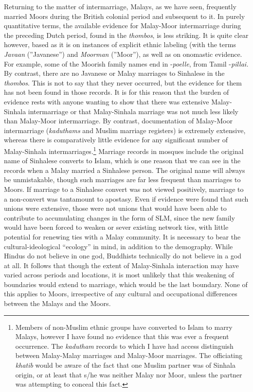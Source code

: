 Returning to the matter of intermarriage, Malays, as we have seen, frequently married Moors during the British colonial period and subsequent to it. In purely quantitative terms, the available evidence for Malay-Moor intermarriage during the preceding Dutch period, found in the \textit{thombos}, is less striking. It is quite clear however, based as it is on instances of explicit ethnic labeling (with the terms \textit{Javaan} (''Javanese'') and \textit{Moorman} (''Moor''), as well as on onomastic evidence. For example, some of the Moorish family names end in -\textit{poelle}, from Tamil -\textit{pillai. }By contrast, there are no Javanese or Malay marriages to Sinhalese in the \textit{thombos}. This is not to say that they never occurred, but the evidence for them has not been found in those records. It is for this reason that the burden of evidence rests with anyone wanting to show that there was extensive Malay-Sinhala intermarriage or that Malay-Sinhala marriage was not much less likely than Malay-Moor intermarriage. By contrast, documentation of Malay-Moor intermarriage (\textit{kaduthams} and Muslim marriage registers) is extremely extensive, whereas there is comparatively little evidence for any significant number of Malay-Sinhala intermarriages.\footnote{Members
  of non-Muslim ethnic groups have converted to Islam to marry Malays, however I have found no evidence that this was ever a frequent occurrence. The \textit{kadutham }records to which I have had access distinguish between Malay-Malay marriages and Malay-Moor marriages. The officiating \textit{khatib }would be aware of the fact that one Muslim partner was of Sinhala origin, or at least that s/he was neither Malay nor Moor, unless the partner was attempting to conceal this fact.
} Marriage records in mosques include the original name of Sinhalese converts to Islam, which is one reason that we can see in the records when a Malay married a Sinhalese person. The original name will always be unmistakable, though such marriages are far less frequent than marriages to Moors. If marriage to a Sinhalese convert was not viewed positively, marriage to a non-convert was tantamount to apostasy. Even if evidence were found that such unions were extensive, those were not unions that would have been able to contribute to accumulating changes in the form of SLM, since the new family would have been forced to weaken or sever existing network ties, with little potential for renewing ties with a Malay community. It is necessary to bear the cultural-ideological ``ecology'' in mind, in addition to the demography. While Hindus do not believe in one god, Buddhists technically do not believe in a god at all. It follows that though the extent of Malay-Sinhala interaction may have varied across periods and locations, it is most unlikely that this weakening of boundaries would extend to marriage, which would be the last boundary. None of this applies to Moors, irrespective of any cultural and occupational differences between the Malays and the Moors.

